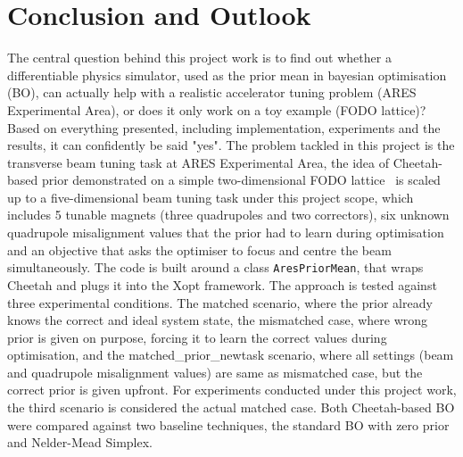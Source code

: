 \section{Conclusion and Outlook}

The central question behind this project work is to find out whether a differentiable physics simulator, 
used as the prior mean in bayesian optimisation (BO), can actually help with a realistic accelerator tuning problem (ARES Experimental Area), 
or does it only work on a toy example (FODO lattice)? Based on everything presented, including implementation, experiments and the results, it can confidently be said "yes".
The problem tackled in this project is the transverse beam tuning task
at ARES Experimental Area, the idea of Cheetah-based prior demonstrated on a simple two-dimensional FODO lattice~\cite{kaiser2024bridging} 
is scaled up to a five-dimensional beam tuning task under this project scope, which includes 5 tunable magnets (three quadrupoles and two correctors), six unknown quadrupole
misalignment values that the prior had to learn during optimisation and an objective that asks the
optimiser to focus and centre the beam simultaneously. 
The code is built around a class \texttt{AresPriorMean}, that
wraps Cheetah and plugs it into the Xopt framework. The approach is tested against three experimental conditions. The matched scenario, where
the prior already knows the correct and ideal system state, the mismatched case, where wrong prior is given on purpose, 
forcing it to learn  the correct values during optimisation, and the matched\_prior\_newtask
scenario, where all settings (beam and  quadrupole misalignment values) are same as mismatched case, but the correct prior is given upfront. For experiments conducted under this project work, the third scenario is considered the actual matched case.
Both Cheetah-based BO were compared against two baseline techniques, the standard BO with zero prior and Nelder-Mead Simplex. 

